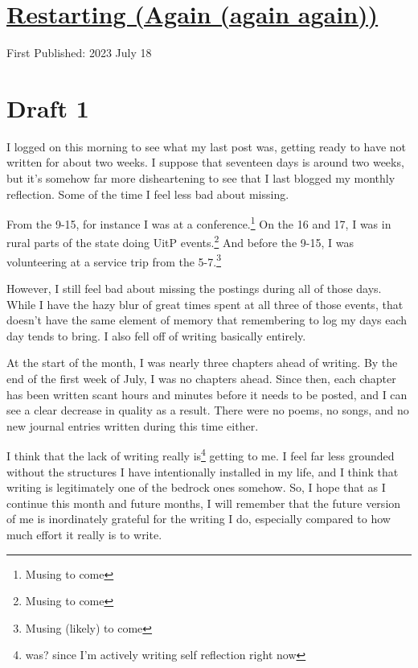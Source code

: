\documentclass[12pt]{article}[titlepage]
\newcommand{\1}{\={a}}
\newcommand{\2}{\={e}}
\newcommand{\3}{\={\i}}
\newcommand{\4}{\=o}
\newcommand{\5}{\=u}
\newcommand{\6}{\={A}}
\renewcommand{\,}{\textsuperscript{,}}
\begin{document}
\doublespacing
\section{\href{restarting-again-again-again.html}{Restarting (Again (again again))}}
First Published: 2023 July 18


\section{Draft 1}
I logged on this morning to see what my last post was, getting ready to have not written for about two weeks.
I suppose that seventeen days is around two weeks, but it's somehow far more disheartening to see that I last blogged my monthly reflection.
Some of the time I feel less bad about missing.

From the 9-15, for instance I was at a conference.\footnote{Musing to come}
On the 16 and 17, I was in rural parts of the state doing UitP events.\footnote{Musing to come}
And before the 9-15, I was volunteering at a service trip from the 5-7.\footnote{Musing (likely) to come}

However, I still feel bad about missing the postings during all of those days.
While I have the hazy blur of great times spent at all three of those events, that doesn't have the same element of memory that remembering to log my days each day tends to bring.
I also fell off of writing basically entirely.

At the start of the month, I was nearly three chapters ahead of writing.
By the end of the first week of July, I was no chapters ahead.
Since then, each chapter has been written scant hours and minutes before it needs to be posted, and I can see a clear decrease in quality as a result.
There were no poems, no songs, and no new journal entries written during this time either.

I think that the lack of writing really is\footnote{was? since I'm actively writing self reflection right now} getting to me.
I feel far less grounded without the structures I have intentionally installed in my life, and I think that writing is legitimately one of the bedrock ones somehow.
So, I hope that as I continue this month and future months, I will remember that the future version of me is inordinately grateful for the writing I do, especially compared to how much effort it really is to write.
\end{document}
